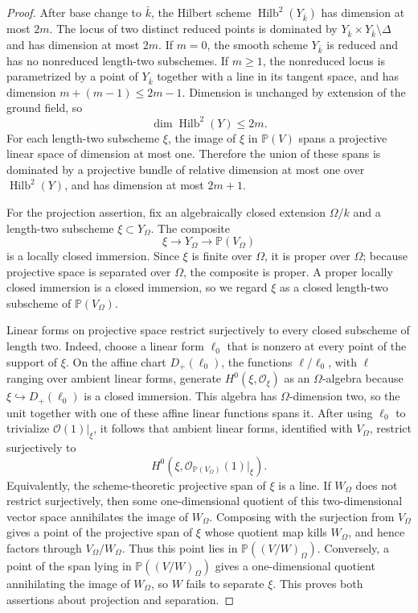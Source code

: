 \documentclass{lms}
\DeclareMathOperator{\Hilb}{Hilb}
\newcommand{\PP}{\mathbb P}
\newcommand{\OO}{\mathcal O}
\begin{document}
\begin{proof}
After base change to $\bar k$, the Hilbert scheme $\Hilb^2(Y_{\bar k})$ has dimension at most $2m$.  The locus of two distinct reduced points is dominated by $Y_{\bar k}\times Y_{\bar k}\setminus\Delta$ and has dimension at most $2m$.  If $m=0$, the smooth scheme $Y_{\bar k}$ is reduced and has no nonreduced length-two subschemes.  If $m\ge1$, the nonreduced locus is parametrized by a point of $Y_{\bar k}$ together with a line in its tangent space, and has dimension $m+(m-1)\le2m-1$.  Dimension is unchanged by extension of the ground field, so
\[
        \dim\Hilb^2(Y)\le 2m.
\]
For each length-two subscheme $\xi$, the image of $\xi$ in $\PP(V)$ spans a projective linear space of dimension at most one.  Therefore the union of these spans is dominated by a projective bundle of relative dimension at most one over $\Hilb^2(Y)$, and has dimension at most $2m+1$.

For the projection assertion, fix an algebraically closed extension $\Omega/k$ and a length-two subscheme $\xi\subset Y_\Omega$.  The composite
\[
        \xi\longrightarrow Y_\Omega\longrightarrow \PP(V_\Omega)
\]
is a locally closed immersion.  Since $\xi$ is finite over $\Omega$, it is proper over $\Omega$; because projective space is separated over $\Omega$, the composite is proper.  A proper locally closed immersion is a closed immersion, so we regard $\xi$ as a closed length-two subscheme of $\PP(V_\Omega)$.

Linear forms on projective space restrict surjectively to every closed subscheme of length two.  Indeed, choose a linear form $\ell_0$ that is nonzero at every point of the support of $\xi$.  On the affine chart $D_+(\ell_0)$, the functions $\ell/\ell_0$, with $\ell$ ranging over ambient linear forms, generate $H^0(\xi,\OO_\xi)$ as an $\Omega$-algebra because $\xi\hookrightarrow D_+(\ell_0)$ is a closed immersion.  This algebra has $\Omega$-dimension two, so the unit together with one of these affine linear functions spans it.  After using $\ell_0$ to trivialize $\OO(1)|_\xi$, it follows that ambient linear forms, identified with $V_\Omega$, restrict surjectively to
\[
        H^0(\xi,\OO_{\PP(V_\Omega)}(1)|_\xi).
\]
Equivalently, the scheme-theoretic projective span of $\xi$ is a line.
If $W_\Omega$ does not restrict surjectively, then some one-dimensional quotient of this two-dimensional vector space annihilates the image of $W_\Omega$.  Composing with the surjection from $V_\Omega$ gives a point of the projective span of $\xi$ whose quotient map kills $W_\Omega$, and hence factors through $V_\Omega/W_\Omega$.  Thus this point lies in $\PP((V/W)_\Omega)$.  Conversely, a point of the span lying in $\PP((V/W)_\Omega)$ gives a one-dimensional quotient annihilating the image of $W_\Omega$, so $W$ fails to separate $\xi$.  This proves both assertions about projection and separation.
\end{proof}
\end{document}
